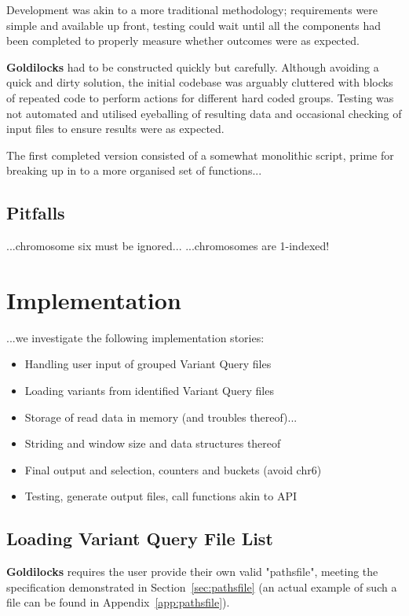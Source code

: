 Development was akin to a more traditional methodology; requirements were simple
and available up front, testing could wait until all the components had been
completed to properly measure whether outcomes were as expected.

\textbf{Goldilocks} had to be constructed quickly but carefully. Although
avoiding a quick and dirty solution, the initial codebase was arguably cluttered
with blocks of repeated code to perform actions for different hard coded groups.
Testing was not automated and utilised eyeballing of resulting data and
occasional checking of input files to ensure results were as expected.

The first completed version consisted of a somewhat monolithic script,
prime for breaking up in to a more organised set of functions...


\subsection{Pitfalls}

...chromosome six must be ignored...
...chromosomes are 1-indexed!


\section{Implementation}
...we investigate the following implementation stories:

\begin{itemize}
    \item Handling user input of grouped Variant Query files
    \item Loading variants from identified Variant Query files
    \item Storage of read data in memory (and troubles thereof)...
    \item Striding and window size and data structures thereof
    \item Final output and selection, counters and buckets (avoid chr6)
    \item Testing, generate output files, call functions akin to API
\end{itemize}


\subsection{Loading Variant Query File List}

\textbf{Goldilocks} requires the user provide their own valid "pathsfile",
meeting the specification demonstrated in Section~\ref{sec:pathsfile} (an
actual example of such a file can be found in Appendix~\ref{app:pathsfile}).

